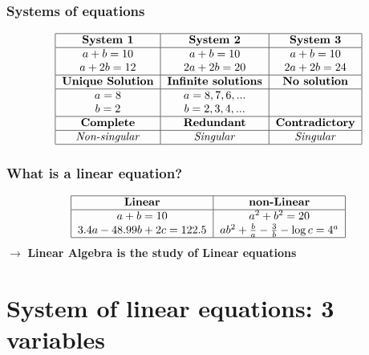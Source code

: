 \documentclass[12pt,a4paper]{article}
\begin{document}
\subsubsection{Systems of equations}
\begin{align*}
    \begin{tabular}{|c|c|c|}
        \hline
        \textbf{System 1}        & \textbf{System 2}           & \textbf{System 3}      \\
        \hline
        $a + b = 10$             & $a + b = 10$                & $a + b = 10$           \\
        $a + 2b = 12$            & $2a + 2b = 20$              & $2a + 2b = 24$         \\
        \hline
        \textbf{Unique Solution} & \textbf{Infinite solutions} & \textbf{No solution}   \\
        \hline
        $a = 8$                  & $a=8,7,6,...$               &                        \\
        $b = 2$                  & $b=2,3,4,...$               &                        \\
        \hline
        \textbf{Complete}        & \textbf{Redundant}          & \textbf{Contradictory} \\
        \hline
        \textit{Non-singular}    & \textit{Singular}           & \textit{Singular}      \\
        \hline
    \end{tabular}
\end{align*}


\subsubsection{What is a linear equation?}
\begin{align*}
    \begin{tabular}{|c|c|}
        \hline
        \textbf{Linear}            & \textbf{non-Linear}                                \\
        \hline
        $a + b = 10$               & $a^2 + b^2 = 20$                                   \\
        $3.4a - 48.99b+2c = 122.5$ & $ab^2 + \frac{b}{a} - \frac{3}{b} - \log{c} = 4^a$ \\
        \hline
    \end{tabular}
\end{align*}
$\rightarrow$ \textbf{Linear Algebra is the study of Linear equations}

\section{System of linear equations: 3 variables}
\end{document}
